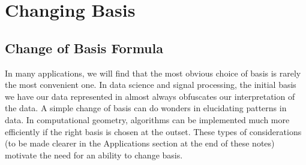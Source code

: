 \documentclass[onecolumn]{gwclass}
\begin{document}
\newpage

\section{Changing Basis}

\subsection{Change of Basis Formula}

In many applications, we will find that the most obvious choice of basis is rarely the most convenient one. In data science and signal processing, the initial basis we have our data represented in almost always obfuscates our interpretation of the data. A simple change of basis can do wonders in elucidating patterns in data. In computational geometry, algorithms can be implemented much more efficiently if the right basis is chosen at the outset. These types of considerations (to be made clearer in the Applications section at the end of these notes) motivate the need for an ability to change basis.
\end{document}

